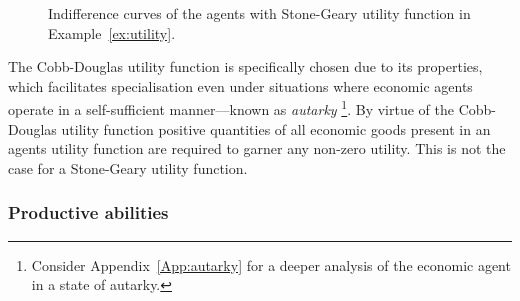 \begin{figure}[t]
\begin{center}
\end{center}
\caption[Indifference curves of the agents with Stone-Geary utility function]{Indifference curves of the agents with Stone-Geary utility function in Example~\ref{ex:utility}.}
\label{fig:utility}
\end{figure}
The Cobb-Douglas utility function is specifically chosen due to its properties, which facilitates specialisation even under situations where economic agents operate in a self-sufficient manner---known as \emph{autarky} \footnote{Consider Appendix~\ref{App:autarky} for a deeper analysis of the economic agent in a state of autarky.}. By virtue of the Cobb-Douglas utility function positive quantities of all economic goods present in an agents utility function are required to garner any non-zero utility. This is not the case for a Stone-Geary utility function.

\subsubsection{Productive abilities}


